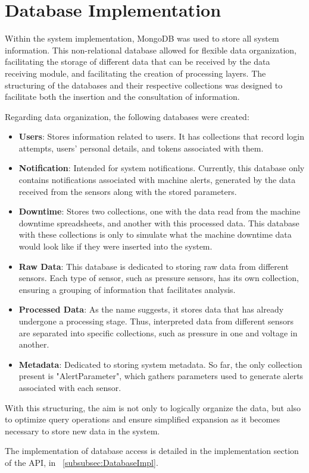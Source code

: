 \section[Database Implementation]{Database Implementation}

Within the system implementation, MongoDB was used to store all system information. This non-relational database allowed for flexible data organization, facilitating the storage of different data that can be received by the data receiving module, and facilitating the creation of processing layers. The structuring of the databases and their respective collections was designed to facilitate both the insertion and the consultation of information.

Regarding data organization, the following databases were created:

\begin{itemize}
    \item \textbf{Users}: Stores information related to users. It has collections that record login attempts, users' personal details, and tokens associated with them.
    
    \item \textbf{Notification}: Intended for system notifications. Currently, this database only contains notifications associated with machine alerts, generated by the data received from the sensors along with the stored parameters.
    
    \item \textbf{Downtime}: Stores two collections, one with the data read from the machine downtime spreadsheets, and another with this processed data. This database with these collections is only to simulate what the machine downtime data would look like if they were inserted into the system.
    
    \item \textbf{Raw Data}: This database is dedicated to storing raw data from different sensors. Each type of sensor, such as pressure sensors, has its own collection, ensuring a grouping of information that facilitates analysis.
    
    \item \textbf{Processed Data}: As the name suggests, it stores data that has already undergone a processing stage. Thus, interpreted data from different sensors are separated into specific collections, such as pressure in one and voltage in another.
    
    \item \textbf{Metadata}: Dedicated to storing system metadata. So far, the only collection present is "AlertParameter", which gathers parameters used to generate alerts associated with each sensor.
\end{itemize}

With this structuring, the aim is not only to logically organize the data, but also to optimize query operations and ensure simplified expansion as it becomes necessary to store new data in the system.

The implementation of database access is detailed in the implementation section of the \gls{API}, in ~\ref{subsubsec:DatabaseImpl}.